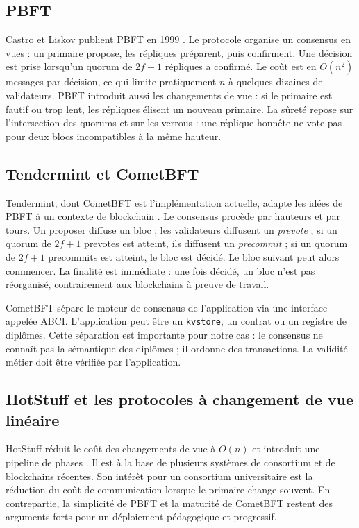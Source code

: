 \documentclass[conference]{IEEEtran}
\begin{document}
\subsection{PBFT}

Castro et Liskov publient PBFT en 1999 \cite{castro1999pbft}. Le protocole organise un consensus en vues : un primaire propose, les répliques préparent, puis confirment. Une décision est prise lorsqu'un quorum de $2f+1$ répliques a confirmé. Le coût est en $O(n^2)$ messages par décision, ce qui limite pratiquement $n$ à quelques dizaines de validateurs. PBFT introduit aussi les changements de vue : si le primaire est fautif ou trop lent, les répliques élisent un nouveau primaire. La sûreté repose sur l'intersection des quorums et sur les verrous : une réplique honnête ne vote pas pour deux blocs incompatibles à la même hauteur.

\subsection{Tendermint et CometBFT}

Tendermint, dont CometBFT est l'implémentation actuelle, adapte les idées de PBFT à un contexte de blockchain \cite{buchman2018tendermint,cometbft2024}. Le consensus procède par hauteurs et par tours. Un proposer diffuse un bloc ; les validateurs diffusent un \emph{prevote} ; si un quorum de $2f+1$ prevotes est atteint, ils diffusent un \emph{precommit} ; si un quorum de $2f+1$ precommits est atteint, le bloc est décidé. Le bloc suivant peut alors commencer. La finalité est immédiate : une fois décidé, un bloc n'est pas réorganisé, contrairement aux blockchains à preuve de travail.

CometBFT sépare le moteur de consensus de l'application via une interface appelée ABCI. L'application peut être un \texttt{kvstore}, un contrat ou un registre de diplômes. Cette séparation est importante pour notre cas : le consensus ne connaît pas la sémantique des diplômes ; il ordonne des transactions. La validité métier doit être vérifiée par l'application.

\subsection{HotStuff et les protocoles à changement de vue linéaire}

HotStuff réduit le coût des changements de vue à $O(n)$ et introduit une pipeline de phases \cite{yin2019hotstuff}. Il est à la base de plusieurs systèmes de consortium et de blockchains récentes. Son intérêt pour un consortium universitaire est la réduction du coût de communication lorsque le primaire change souvent. En contrepartie, la simplicité de PBFT et la maturité de CometBFT restent des arguments forts pour un déploiement pédagogique et progressif.
\end{document}
